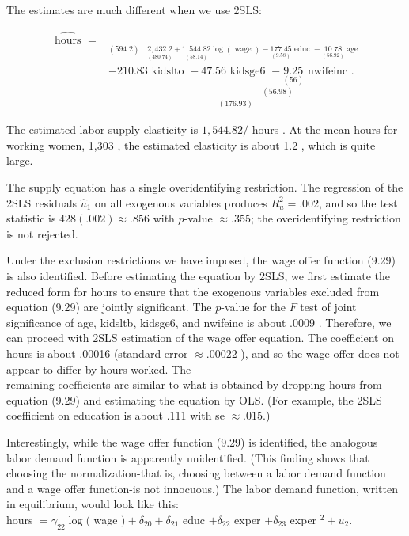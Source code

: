 \documentclass[10pt]{article}
\begin{document}
The estimates are much different when we use 2SLS:

$$
\begin{aligned}
\widehat{\text { hours }}= & \underset{(594.2) \quad \underset{(480.74)}{2,432.2}+\underset{(58.14)}{1,544.82} \log (\text { wage })-\underset{(9.58)}{177.45} \text { educ }-\underset{(56.92)}{10.78} \text { age }}{ } \\
& -\underset{(176.93)}{210.83 \text { kidslto }-\underset{(56.98)}{47.56 \text { kidsge6 }-\underset{(56)}{9.25} \text { nwifeinc } .}}
\end{aligned}
$$

The estimated labor supply elasticity is $1,544.82 /$ hours . At the mean hours for working women, 1,303 , the estimated elasticity is about 1.2 , which is quite large.

The supply equation has a single overidentifying restriction. The regression of the 2SLS residuals $\hat{u}_{1}$ on all exogenous variables produces $R_{u}^{2}=.002$, and so the test statistic is $428(.002) \approx .856$ with $p$-value $\approx .355$; the overidentifying restriction is not rejected.

Under the exclusion restrictions we have imposed, the wage offer function (9.29) is also identified. Before estimating the equation by 2SLS, we first estimate the reduced form for hours to ensure that the exogenous variables excluded from equation (9.29) are jointly significant. The $p$-value for the $F$ test of joint significance of age, kidsltb, kidsge6, and nwifeinc is about .0009 . Therefore, we can proceed with 2SLS estimation of the wage offer equation. The coefficient on hours is about .00016 (standard error $\approx .00022$ ), and so the wage offer does not appear to differ by hours worked. The\\
remaining coefficients are similar to what is obtained by dropping hours from equation (9.29) and estimating the equation by OLS. (For example, the 2SLS coefficient on education is about .111 with se $\approx .015$.)

Interestingly, while the wage offer function (9.29) is identified, the analogous labor demand function is apparently unidentified. (This finding shows that choosing the normalization-that is, choosing between a labor demand function and a wage offer function-is not innocuous.) The labor demand function, written in equilibrium, would look like this:\\
hours $=\gamma_{22} \log ($ wage $)+\delta_{20}+\delta_{21}$ educ $+\delta_{22}$ exper $+\delta_{23}$ exper $^{2}+u_{2}$.
\end{document}
